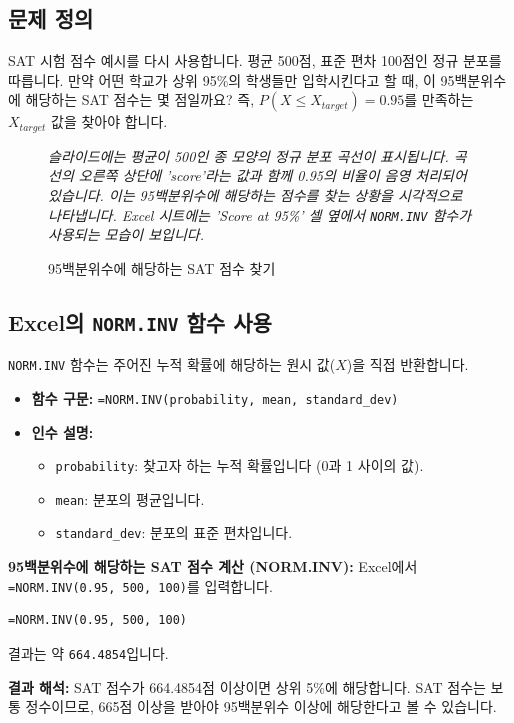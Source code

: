 \documentclass[11pt,a4paper]{article}
\theoremstyle{definition}
\begin{document}
\subsection{문제 정의}
SAT 시험 점수 예시를 다시 사용합니다. 평균 500점, 표준 편차 100점인 정규 분포를 따릅니다.
만약 어떤 학교가 상위 95\%의 학생들만 입학시킨다고 할 때, 이 95백분위수에 해당하는 SAT 점수는 몇 점일까요?
즉, $P(X \le X_{target}) = 0.95$를 만족하는 $X_{target}$ 값을 찾아야 합니다.

\begin{figure}[h!]
    \centering
    \caption{95백분위수에 해당하는 SAT 점수 찾기}
    \label{fig:sat_inv_function}
    \vspace{0.5em}
    \textit{슬라이드에는 평균이 500인 종 모양의 정규 분포 곡선이 표시됩니다. 곡선의 오른쪽 상단에 'score'라는 값과 함께 0.95의 비율이 음영 처리되어 있습니다. 이는 95백분위수에 해당하는 점수를 찾는 상황을 시각적으로 나타냅니다. Excel 시트에는 'Score at 95\%' 셀 옆에서 \texttt{NORM.INV} 함수가 사용되는 모습이 보입니다.}
\end{figure}

\subsection{Excel의 \texttt{NORM.INV} 함수 사용}
\texttt{NORM.INV} 함수는 주어진 누적 확률에 해당하는 원시 값($X$)을 직접 반환합니다.

\begin{itemize}
    \item \textbf{함수 구문:} \texttt{=NORM.INV(probability, mean, standard\_dev)}
    \item \textbf{인수 설명:}
    \begin{itemize}
        \item \texttt{probability}: 찾고자 하는 누적 확률입니다 (0과 1 사이의 값).
        \item \texttt{mean}: 분포의 평균입니다.
        \item \texttt{standard\_dev}: 분포의 표준 편차입니다.
    \end{itemize}
\end{itemize}

\begin{examplebox}
    \textbf{95백분위수에 해당하는 SAT 점수 계산 (NORM.INV):}
    Excel에서 \texttt{=NORM.INV(0.95, 500, 100)}를 입력합니다.
    \begin{lstlisting}[language=Excel, caption={Excel에서 NORM.INV 함수 사용 예시}, label={lst:norm_inv_example}]
=NORM.INV(0.95, 500, 100)
    \end{lstlisting}
    결과는 약 \texttt{664.4854}입니다.

    \textbf{결과 해석:}
    SAT 점수가 664.4854점 이상이면 상위 5\%에 해당합니다.
    SAT 점수는 보통 정수이므로, 665점 이상을 받아야 95백분위수 이상에 해당한다고 볼 수 있습니다.
\end{examplebox}
\end{document}

